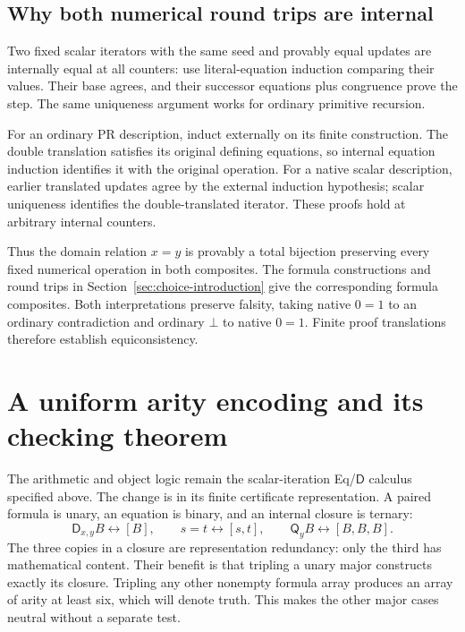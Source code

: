 \documentclass[11pt,letterpaper]{article}
\theoremstyle{definition}\newtheorem{definition}[theorem]{Definition}
\theoremstyle{remark}\newtheorem{remark}[theorem]{Remark}
\newcommand{\D}{\mathsf D}
\newcommand{\Q}{\mathsf Q}
\begin{document}
\subsection{Why both numerical round trips are internal}

Two fixed scalar iterators with the same seed and provably equal
updates are internally equal at all counters: use literal-equation
induction comparing their values. Their base agrees, and their
successor equations plus congruence prove the step. The same
uniqueness argument works for ordinary primitive recursion.

For an ordinary PR description, induct externally on its finite
construction. The double translation satisfies its original
defining equations, so internal equation induction identifies it
with the original operation. For a native scalar description,
earlier translated updates agree by the external induction
hypothesis; scalar uniqueness identifies the double-translated
iterator. These proofs hold at arbitrary internal counters.

Thus the domain relation $x=y$ is provably a total bijection
preserving every fixed numerical operation in both composites.
The formula constructions and round trips in
Section~\ref{sec:choice-introduction} give the corresponding formula
composites. Both interpretations preserve falsity, taking native
$0=1$ to an ordinary contradiction and ordinary $\bot$ to native
$0=1$. Finite proof translations therefore establish equiconsistency.

\section{A uniform arity encoding and its checking theorem}
\label{sec:arity-checker}

The arithmetic and object logic remain the scalar-iteration Eq/$\D$
calculus specified above.  The change is in its finite certificate
representation.  A paired formula is unary, an equation is binary, and
an internal closure is ternary:
\[
 \D_{x,y}B\longleftrightarrow[B],\qquad
 s=t\longleftrightarrow[s,t],\qquad
 \Q_yB\longleftrightarrow[B,B,B].
 \tag{Arity encoding}\label{eq:arity-encoding}
\]
The three copies in a closure are representation redundancy: only the
third has mathematical content.  Their benefit is that tripling a unary
major constructs exactly its closure.  Tripling any other nonempty
formula array produces an array of arity at least six, which will denote
truth.  This makes the other major cases neutral without a separate
test.
\end{document}
